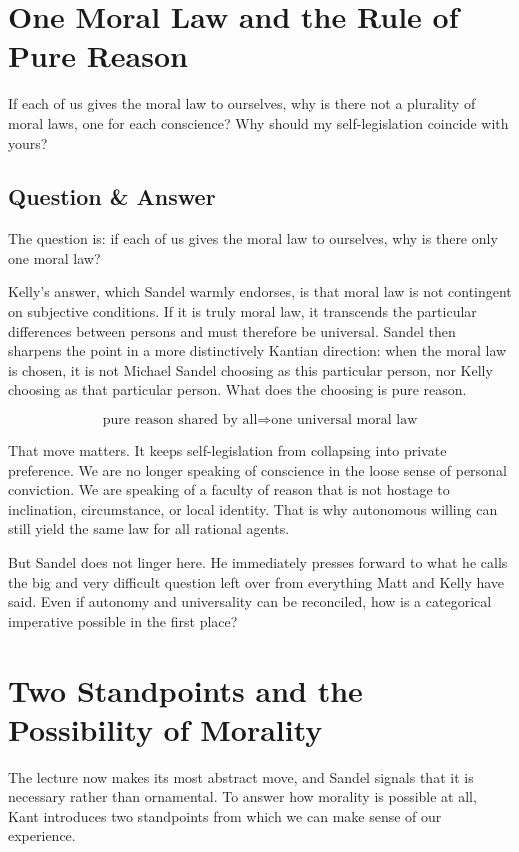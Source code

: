 \section{One Moral Law and the Rule of Pure Reason}

If each of us gives the moral law to ourselves, why is there not a plurality of moral laws, one for each conscience? Why should my self-legislation coincide with yours?

\subsection{Question \& Answer}

The question is: if each of us gives the moral law to ourselves, why is there only one moral law?

Kelly's answer, which Sandel warmly endorses, is that moral law is not contingent on subjective conditions. If it is truly moral law, it transcends the particular differences between persons and must therefore be universal. Sandel then sharpens the point in a more distinctively Kantian direction: when the moral law is chosen, it is not Michael Sandel choosing as this particular person, nor Kelly choosing as that particular person. What does the choosing is pure reason.

\begin{equation}
\text{pure reason shared by all} \Longrightarrow \text{one universal moral law}
\end{equation}

That move matters. It keeps self-legislation from collapsing into private preference. We are no longer speaking of conscience in the loose sense of personal conviction. We are speaking of a faculty of reason that is not hostage to inclination, circumstance, or local identity. That is why autonomous willing can still yield the same law for all rational agents.

But Sandel does not linger here. He immediately presses forward to what he calls the big and very difficult question left over from everything Matt and Kelly have said. Even if autonomy and universality can be reconciled, how is a categorical imperative possible in the first place?

\section{Two Standpoints and the Possibility of Morality}

The lecture now makes its most abstract move, and Sandel signals that it is necessary rather than ornamental. To answer how morality is possible at all, Kant introduces two standpoints from which we can make sense of our experience.

